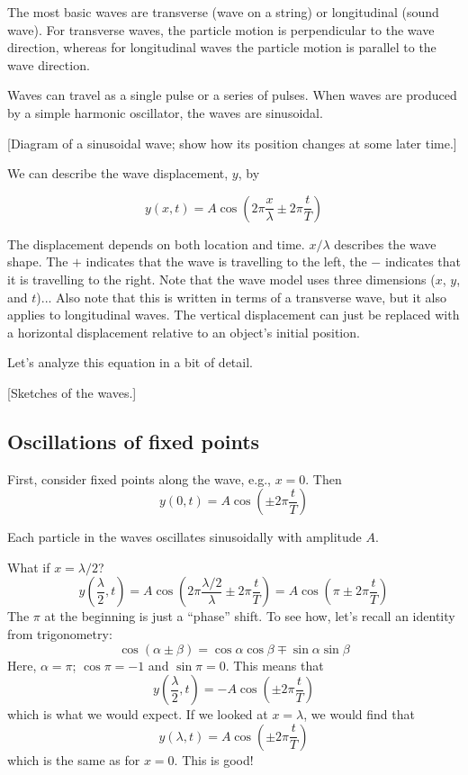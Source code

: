The most basic waves are transverse (wave on a string) or longitudinal (sound wave). For transverse waves, the particle motion is perpendicular to the wave direction, whereas for longitudinal waves the particle motion is parallel to the wave direction.

Waves can travel as a single pulse or a series of pulses. When waves are produced by a simple harmonic oscillator, the waves are sinusoidal.

[Diagram of a sinusoidal wave; show how its position changes at some later time.]\nopagebreak
\vspace{5cm}


We can describe the wave displacement, $y$, by

$$y(x,t)=A\cos\left(2\pi\frac{x}{\lambda}\pm 2\pi\frac{t}{T}\right)$$

The displacement depends on both location and time. $x/\lambda$ describes the wave shape. The $+$ indicates that the wave is travelling to the left, the $-$ indicates that it is travelling to the right. Note that the wave model uses three dimensions ($x$, $y$, and $t$)... Also note that this is written in terms of a transverse wave, but it also applies to longitudinal waves. The vertical displacement can just be replaced with a horizontal displacement relative to an object's initial position.

Let's analyze this equation in a bit of detail. 

[Sketches of the waves.]\nopagebreak
\vspace{5cm}

\subsection{Oscillations of fixed points}
First, consider fixed points along the wave, e.g., $x=0$. Then
$$y(0,t)=A\cos\left(\pm 2\pi\frac{t}{T}\right)$$

Each particle in the waves oscillates sinusoidally with amplitude $A$.

What if $x=\lambda/2$?
$$y\left(\frac{\lambda}{2},t\right)=A\cos\left(2\pi\frac{\lambda/2}{\lambda}\pm 2\pi\frac{t}{T}\right)=A\cos\left(\pi\pm 2\pi\frac{t}{T}\right)$$
The $\pi$ at the beginning is just a ``phase'' shift. To see how, let's recall an identity from trigonometry:
$$\cos(\alpha\pm\beta)=\cos\alpha\cos\beta\mp\sin\alpha\sin\beta$$
Here, $\alpha=\pi$; $\cos\pi=-1$ and $\sin\pi=0$. This means that
$$y\left(\frac{\lambda}{2},t\right)=-A\cos\left(\pm 2\pi\frac{t}{T}\right)$$
which is what we would expect. If we looked at $x=\lambda$, we would find that 
$$y(\lambda,t)=A\cos\left(\pm 2\pi\frac{t}{T}\right)$$
which is the same as for $x=0$. This is good!

